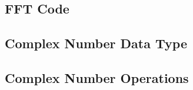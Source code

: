 \documentclass[11pt]{article}
\begin{document}


\subsection{FFT Code}
\label{sub:fft_code}



\subsection{Complex Number Data Type}
\label{sub:complex_number_data_type}



\subsection{Complex Number Operations}
\label{sub:complex_number_operations}


\end{document}
